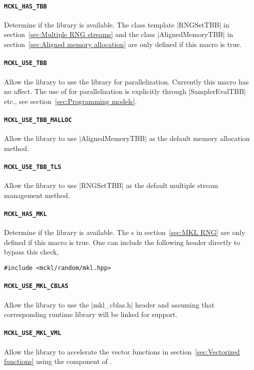 \paragraph{\texttt{MCKL\_HAS\_TBB}} Determine if the \tbb library is available.
The class template |RNGSetTBB| in section~\ref{sec:Multiple RNG streams} and
the class |AlignedMemoryTBB| in section~\ref{sec:Aligned memory allocation} are
only defined if this macro is true.

\paragraph{\texttt{MCKL\_USE\_TBB}} Allow the library to use the \tbb library
for parallelization. Currently this macro has no affect. The use of \tbb for
parallelization is explicitly through |SamplerEvalTBB| etc., see
section~\ref{sec:Programming models}.

\paragraph{\texttt{MCKL\_USE\_TBB\_MALLOC}} Allow the library to use
|AlignedMemoryTBB| as the default memory allocation method.

\paragraph{\texttt{MCKL\_USE\_TBB\_TLS}} Allow the library to use |RNGSetTBB|
as the default multiple \rng stream management method.

\paragraph{\texttt{MCKL\_HAS\_MKL}} Determine if the \mkl library is available.
The \rng{}s in section~\ref{sec:MKL RNG} are only defined if this macro is
true. One can include the following header directly to bypass this check,
\begin{verbatim}
#include <mckl/random/mkl.hpp>
\end{verbatim}

\paragraph{\texttt{MCKL\_USE\_MKL\_CBLAS}} Allow the library to use the
|mkl_cblas.h| header and assuming that corresponding runtime library will be
linked for \blas support.

\paragraph{\texttt{MCKL\_USE\_MKL\_VML}} Allow the library to accelerate the
vector functions in section~\ref{sec:Vectorized functions} using the \vml
component of \mkl.

